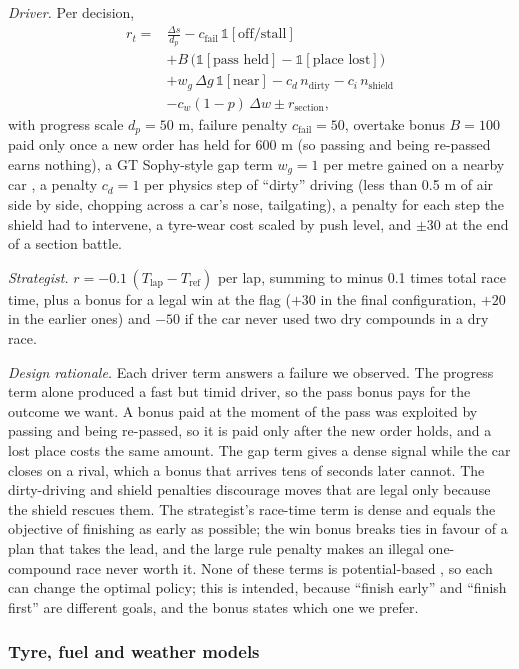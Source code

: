 \documentclass{ieeeaccess}
\begin{document}
\emph{Driver.} Per decision,
\[\begin{aligned}
r_t ={}& \frac{\Delta s}{d_p} - c_{\text{fail}}\,\mathbb 1[\text{off/stall}]\\
&+ B\,\big(\mathbb 1[\text{pass held}] - \mathbb 1[\text{place lost}]\big)\\
&+ w_g\,\Delta g\,\mathbb 1[\text{near}] - c_d\, n_{\text{dirty}}
- c_i\, n_{\text{shield}}\\
&- c_w(1-p)\,\Delta w \pm r_{\text{section}},
\end{aligned}\]
with progress scale \(d_p=50\) m, failure penalty \(c_{\text{fail}}=50\), overtake
bonus \(B=100\) paid only once a new order has held for 600 m (so passing and being
re-passed earns nothing), a GT Sophy-style gap term \(w_g=1\) per metre gained on a
nearby car \cite{b14}, a penalty \(c_d=1\) per physics step of ``dirty'' driving (less than
0.5 m of air side by side, chopping across a car's nose, tailgating), a penalty for
each step the shield had to intervene, a tyre-wear cost scaled by push level, and
\(\pm 30\) at the end of a section battle.

\emph{Strategist.} \(r = -0.1\,(T_{\text{lap}}-T_{\text{ref}})\) per lap, summing to minus
0.1 times total race time, plus a bonus for a legal win at the flag (\(+30\) in the
final configuration, \(+20\) in the earlier ones) and \(-50\) if the car never used two
dry compounds in a dry race.

\emph{Design rationale.} Each driver term answers a failure we observed. The progress
term alone produced a fast but timid driver, so the pass bonus pays for the
outcome we want. A bonus paid at the moment of the pass was exploited by passing
and being re-passed, so it is paid only after the new order holds, and a lost place
costs the same amount. The gap term gives a dense signal while the car closes on a
rival, which a bonus that arrives tens of seconds later cannot. The dirty-driving
and shield penalties discourage moves that are legal only because the shield
rescues them. The strategist's race-time term is dense and equals the objective of
finishing as early as possible; the win bonus breaks ties in favour of a plan that
takes the lead, and the large rule penalty makes an illegal one-compound race never
worth it. None of these terms is potential-based \cite{b30}, so each can change the optimal
policy; this is intended, because ``finish early'' and ``finish first'' are different
goals, and the bonus states which one we prefer.

\subsubsection{Tyre, fuel and weather models}
\end{document}
